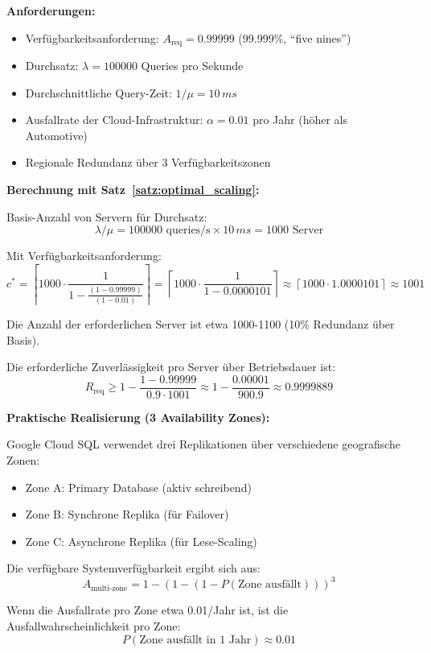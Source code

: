 \documentclass[a4paper,11pt]{article}
\theoremstyle{definition}
\begin{document}
\textbf{Anforderungen:}
\begin{itemize}
    \item Verfügbarkeitsanforderung: $A_{\text{req}} = 0.99999$ (99.999\%, ``five nines'')
    \item Durchsatz: $\lambda = 100000$ Queries pro Sekunde
    \item Durchschnittliche Query-Zeit: $1/\mu = 10 \, ms$
    \item Ausfallrate der Cloud-Infrastruktur: $\alpha = 0.01$ pro Jahr (höher als Automotive)
    \item Regionale Redundanz über 3 Verfügbarkeitszonen
\end{itemize}

\textbf{Berechnung mit Satz~\ref{satz:optimal_scaling}:}

Basis-Anzahl von Servern für Durchsatz:
\[
    \lambda / \mu = 100000 \text{ queries/s} \times 10 \, ms = 1000 \text{ Server}
\]

Mit Verfügbarkeitsanforderung:
\[
    c^* = \left\lceil 1000 \cdot \frac{1}{1 - \frac{(1-0.99999)}{(1-0.01)}} \right\rceil
    = \left\lceil 1000 \cdot \frac{1}{1 - 0.0000101} \right\rceil
    \approx \left\lceil 1000 \cdot 1.0000101 \right\rceil \approx 1001
\]

Die Anzahl der erforderlichen Server ist etwa 1000-1100 (10\% Redundanz über Basis).

Die erforderliche Zuverlässigkeit pro Server über Betriebsdauer ist:
\[
    R_{\text{req}} \geq 1 - \frac{1 - 0.99999}{0.9 \cdot 1001} \approx 1 - \frac{0.00001}{900.9} 
    \approx 0.9999889
\]

\textbf{Praktische Realisierung (3 Availability Zones):}

Google Cloud SQL verwendet drei Replikationen über verschiedene geografische Zonen:
\begin{itemize}
    \item Zone A: Primary Database (aktiv schreibend)
    \item Zone B: Synchrone Replika (für Failover)
    \item Zone C: Asynchrone Replika (für Lese-Scaling)
\end{itemize}

Die verfügbare Systemverfügbarkeit ergibt sich aus:
\[
    A_{\text{multi-zone}} = 1 - (1 - (1 - P(\text{Zone ausfällt})))^3
\]

Wenn die Ausfallrate pro Zone etwa 0.01/Jahr ist, ist die Ausfallwahrscheinlichkeit pro Zone:
\[
    P(\text{Zone ausfällt in 1 Jahr}) \approx 0.01
\]
\end{document}
